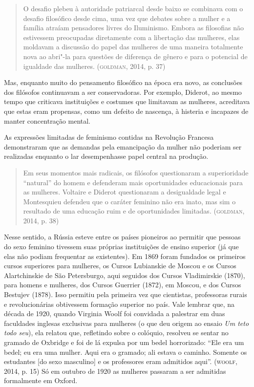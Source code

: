 \documentclass[11pt]{extarticle}
\begin{document}
\begin{quote}
O desafio plebeu à autoridade patriarcal desde baixo se combinava com o
desafio filosófico desde cima, uma vez que debates sobre a mulher e a
família atraíam pensadores livres do Iluminismo. Embora as filosofias
não estivessem preocupadas diretamente com a libertação das mulheres,
elas moldavam a discussão do papel das mulheres de uma maneira
totalmente nova ao abri"-la para questões de diferença de gênero e para o
potencial de igualdade das mulheres. (\textsc{goldman}, 2014, p. 37)
\end{quote}

Mas, enquanto muito do pensamento filosófico na época era novo, as
conclusões dos filósofos continuavam a ser conservadoras. Por exemplo,
Diderot, ao mesmo tempo que criticava instituições e costumes que
limitavam as mulheres, acreditava que estas eram propensas, como um
defeito de nascença, à histeria e incapazes de manter concentração
mental.

As expressões limitadas de feminismo contidas na Revolução Francesa
demonstraram que as demandas pela emancipação da mulher não poderiam ser
realizadas enquanto o lar desempenhasse papel central na produção.

\begin{quote}
Em seus momentos mais radicais, os filósofos questionaram a
superioridade ``natural'' do homem e defenderam mais oportunidades
educacionais para as mulheres. Voltaire e Diderot questionaram a
desigualdade legal e Montesquieu defendeu que o caráter feminino não era
inato, mas sim o resultado de uma educação ruim e de oportunidades
limitadas. (\textsc{goldman}, 2014, p. 38)
\end{quote}

Nesse sentido, a Rússia esteve
entre os países pioneiros ao permitir que pessoas do sexo feminino
tivessem suas próprias instituições de ensino superior (já que elas não
podiam frequentar as existentes). Em 1869 foram fundados os primeiros
cursos superiores para mulheres, os Cursos Lubianskie de Moscou e os
Cursos Alartchinskie de São Petersburgo, aqui seguidos dos Cursos
Vladimirskie (1870), para homens e mulheres, dos Cursos Guerrier (1872),
em Moscou, e dos Cursos Bestujev (1878). Isso permitiu pela primeira vez
que cientistas, professoras rurais e revolucionárias obtivessem formação
superior no país. Vale lembrar que, na década de 1920, quando Virginia
Woolf foi convidada a palestrar em duas faculdades inglesas exclusivas
para mulheres (o que deu origem ao ensaio \emph{Um teto todo seu}), ela
relatou que, refletindo sobre o colóquio, resolveu se sentar no gramado
de Oxbridge e foi de lá expulsa por um bedel horrorizado: ``Ele era um
bedel; eu era uma mulher. Aqui era o gramado; ali estava o caminho.
Somente os estudantes {[}do sexo masculino{]} e os professores eram
admitidos aqui''. (\textsc{woolf}, 2014, p. 15) Só em outubro de 1920 as mulheres
passaram a ser admitidas formalmente em Oxford.
\end{document}
